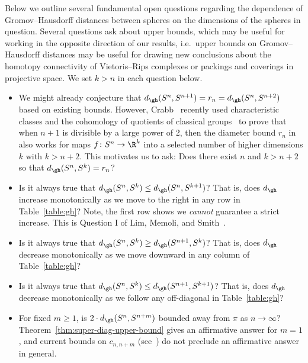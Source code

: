 \documentclass[11pt, reqno, english]{amsart}
\begin{document}
\begin{question}
Below we outline several fundamental open questions regarding the dependence of Gromov--Hausdorff distances between spheres on the dimensions of the spheres in question.
Several questions ask about upper bounds, which may be useful for working in the opposite direction of our results, i.e.\ upper bounds on Gromov--Hausdorff distances may be useful for drawing new conclusions about the homotopy connectivity of Vietoris--Rips complexes or packings and coverings in projective space.
We set $k>n$ in each question below.
\begin{itemize}
    \item
    We might already conjecture that $d_\gh(S^n,S^{n+1})=r_n=d_\gh(S^n,S^{n+2})$ based on existing bounds.
    However, Crabb~\cite[Theorem~3.1]{crabb2021borsuk} recently used characteristic classes and the cohomology of quotients of classical groups~\cite{baum1965cohomology} to prove that when $n+1$ is divisible by a large power of 2, then the diameter bound $r_n$ in~\cite[Theorem~3]{ABF} also works for maps $f\colon S^n\to\R^k$ into a selected number of higher dimensions $k$ with $k>n+2$.
    This motivates us to ask: Does there exist $n$ and $k > n+2$ so that $d_\gh(S^n,S^k)=r_n$?
    \item Is it always true that $d_\gh(S^n, S^k) \le d_\gh(S^n, S^{k+1})$? 
    That is, does $d_\gh$ increase monotonically as we move to the right in any row in Table~\ref{table:gh}?
    Note, the first row shows we \emph{cannot} guarantee a strict increase.
    This is Question I of Lim, Memoli, and Smith~\cite{lim2021gromov}.
    \item Is it always true that $d_\gh(S^n, S^k) \ge d_\gh(S^{n+1}, S^{k})$?
    That is, does $d_\gh$ decrease monotonically as we move downward in any column of Table~\ref{table:gh}?
    \item Is it always true that $d_\gh(S^n, S^k) \le d_\gh(S^{n+1}, S^{k+1})$?
    That is, does $d_\gh$ decrease monotonically as we follow any off-diagonal in Table~\ref{table:gh}?
    \item For fixed $m\ge 1$, is $2\cdot d_\gh(S^n, S^{n+m})$ bounded away from $\pi$ as $n\to\infty$?
    Theorem~\ref{thm:super-diag-upper-bound} gives an affirmative answer for $m=1$, and current bounds on $c_{n, n+m}$ (see~\cite[Corollary 3.2]{ABF2}) do not preclude an affirmative answer in general.

\end{itemize}
\end{question}
\end{document}
